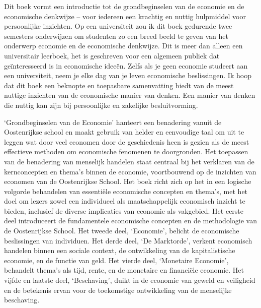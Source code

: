 \documentclass[
  a5paper,
  smalldemyvopaper,11pt,twoside,onecolumn,openright,extrafontsizes,
hidelinks]{memoir}
\begin{document}
Dit boek vormt een introductie tot de grondbeginselen van de economie en
de economische denkwijze -- voor iedereen een krachtig en nuttig
hulpmiddel voor persoonlijke inzichten. Op een universiteit zou ik dit
boek gedurende twee semesters onderwijzen om studenten zo een breed
beeld te geven van het onderwerp economie en de economische denkwijze.
Dit is meer dan alleen een universitair leerboek, het is geschreven voor
een algemeen publiek dat geïnteresseerd is in economische ideeën. Zelfs
als je geen economie studeert aan een universiteit, neem je elke dag van
je leven economische beslissingen. Ik hoop dat dit boek een beknopte en
toepasbare samenvatting biedt van de meest nuttige inzichten van de
economische manier van denken. Een manier van denken die nuttig kan zijn
bij persoonlijke en zakelijke besluitvorming.

`Grondbeginselen van de Economie' hanteert een benadering vanuit de
Oostenrijkse school en maakt gebruik van helder en eenvoudige taal om
uit te leggen wat door veel economen door de geschiedenis heen is gezien
als de meest effectieve methoden om economische fenomenen te
doorgronden. Het toepassen van de benadering van menselijk handelen
staat centraal bij het verklaren van de kernconcepten en thema's binnen
de economie, voortbouwend op de inzichten van economen van de
Oostenrijkse School. Het boek richt zich op het in een logische volgorde
behandelen van essentiële economische concepten en thema's, met het doel
om lezers zowel een individueel als maatschappelijk economisch inzicht
te bieden, inclusief de diverse implicaties van economie als vakgebied.
Het eerste deel introduceert de fundamentele economische concepten en de
methodologie van de Oostenrijkse School. Het tweede deel, `Economie',
belicht de economische beslissingen van individuen. Het derde deel, `De
Marktorde', verkent economisch handelen binnen een sociale context, de
ontwikkeling van de kapitalistische economie, en de functie van geld.
Het vierde deel, `Monetaire Economie', behandelt thema's als tijd,
rente, en de monetaire en financiële economie. Het vijfde en laatste
deel, `Beschaving', duikt in de economie van geweld en veiligheid en de
betekenis ervan voor de toekomstige ontwikkeling van de menselijke
beschaving.
\end{document}
